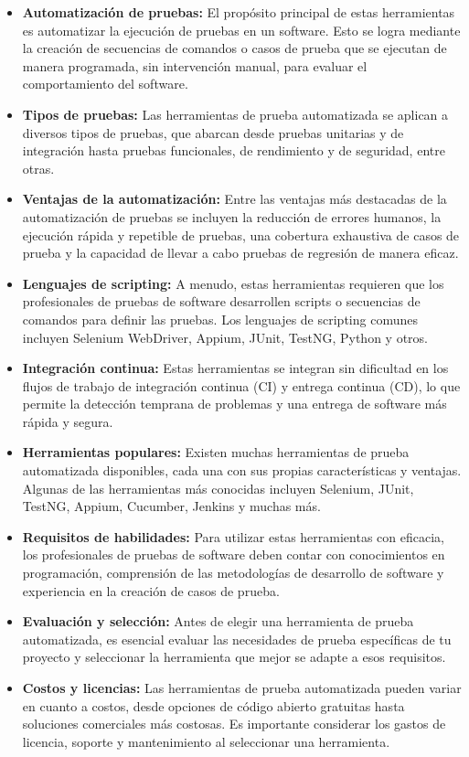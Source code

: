\documentclass[letterpaper]{article}
\begin{document}
\begin{itemize}[series=listWWNumx,]
\item \textbf{Automatización de pruebas:} El propósito principal de estas herramientas es automatizar la ejecución de
pruebas en un software. Esto se logra mediante la creación de secuencias de comandos o casos de prueba que se ejecutan
de manera programada, sin intervención manual, para evaluar el comportamiento del software.
\item \textbf{Tipos de pruebas:} Las herramientas de prueba automatizada se aplican a diversos tipos de pruebas, que
abarcan desde pruebas unitarias y de integración hasta pruebas funcionales, de rendimiento y de seguridad, entre otras.
\item \textbf{Ventajas de la automatización:} Entre las ventajas más destacadas de la automatización de pruebas se
incluyen la reducción de errores humanos, la ejecución rápida y repetible de pruebas, una cobertura exhaustiva de casos
de prueba y la capacidad de llevar a cabo pruebas de regresión de manera eficaz.
\item \textbf{Lenguajes de scripting:} A menudo, estas herramientas requieren que los profesionales de pruebas de
software desarrollen scripts o secuencias de comandos para definir las pruebas. Los lenguajes de scripting comunes
incluyen Selenium WebDriver, Appium, JUnit, TestNG, Python y otros.
\item \textbf{Integración continua:} Estas herramientas se integran sin dificultad en los flujos de trabajo de
integración continua (CI) y entrega continua (CD), lo que permite la detección temprana de problemas y una entrega de
software más rápida y segura.
\item \textbf{Herramientas populares:} Existen muchas herramientas de prueba automatizada disponibles, cada una con sus
propias características y ventajas. Algunas de las herramientas más conocidas incluyen Selenium, JUnit, TestNG, Appium,
Cucumber, Jenkins y muchas más.
\item \textbf{Requisitos de habilidades:} Para utilizar estas herramientas con eficacia, los profesionales de pruebas de
software deben contar con conocimientos en programación, comprensión de las metodologías de desarrollo de software y
experiencia en la creación de casos de prueba.
\item \textbf{Evaluación y selección:} Antes de elegir una herramienta de prueba automatizada, es esencial evaluar las
necesidades de prueba específicas de tu proyecto y seleccionar la herramienta que mejor se adapte a esos requisitos.
\item \textbf{Costos y licencias:} Las herramientas de prueba automatizada pueden variar en cuanto a costos, desde
opciones de código abierto gratuitas hasta soluciones comerciales más costosas. Es importante considerar los gastos de
licencia, soporte y mantenimiento al seleccionar una herramienta.
\end{itemize}
\end{document}
